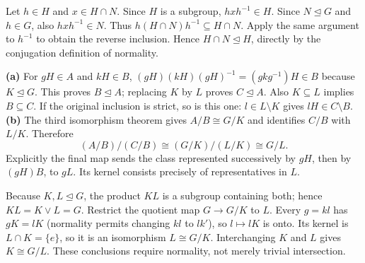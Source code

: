 Let $h\in H$ and $x\in H\cap N$. Since $H$ is a subgroup, $hxh^{-1}\in H$.
Since $N\trianglelefteq G$ and $h\in G$, also $hxh^{-1}\in N$.
Thus $h(H\cap N)h^{-1}\subseteq H\cap N$. Apply the same argument to $h^{-1}$ to obtain the reverse inclusion. Hence $H\cap N\trianglelefteq H$, directly by the conjugation definition of normality.

\textbf{(a)} For $gH\in A$ and $kH\in B$,
$(gH)(kH)(gH)^{-1}=(gkg^{-1})H\in B$ because $K\trianglelefteq G$.
This proves $B\trianglelefteq A$; replacing $K$ by $L$ proves $C\trianglelefteq A$.
Also $K\subseteq L$ implies $B\subseteq C$. If the original inclusion is strict, so is this one: $l\in L\setminus K$ gives $lH\in C\setminus B$.
\textbf{(b)} The third isomorphism theorem gives $A/B\cong G/K$ and identifies $C/B$ with $L/K$. Therefore
\[
(A/B)/(C/B)\cong(G/K)/(L/K)\cong G/L.
\]
Explicitly the final map sends the class represented successively by $gH$, then by $(gH)B$, to $gL$. Its kernel consists precisely of representatives in $L$.

Because $K,L\trianglelefteq G$, the product $KL$ is a subgroup containing both; hence $KL=K\vee L=G$.
Restrict the quotient map $G\to G/K$ to $L$. Every $g=kl$ has $gK=lK$ (normality permits changing $kl$ to $lk'$), so $l\mapsto lK$ is onto. Its kernel is $L\cap K=\{e\}$, so it is an isomorphism $L\cong G/K$.
Interchanging $K$ and $L$ gives $K\cong G/L$. These conclusions require normality, not merely trivial intersection.
